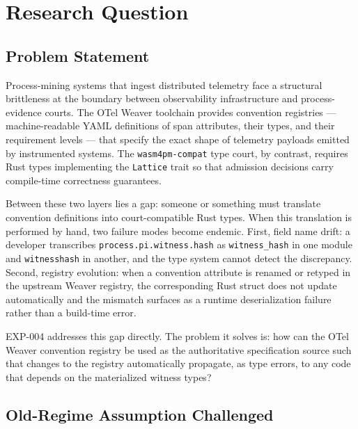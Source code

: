 
\section{Research Question}
\label{sec:otel-weaver-exp-004-registry-to-witness-question}

\subsection{Problem Statement}
\label{sec:otel-weaver-exp-004-registry-to-witness-problem}

Process-mining systems that ingest distributed telemetry face a structural brittleness at
the boundary between observability infrastructure and process-evidence courts. The OTel
Weaver toolchain provides convention registries --- machine-readable YAML definitions of
span attributes, their types, and their requirement levels --- that specify the exact shape
of telemetry payloads emitted by instrumented systems. The \texttt{wasm4pm-compat} type
court, by contrast, requires Rust types implementing the \texttt{Lattice} trait so that
admission decisions carry compile-time correctness guarantees.

Between these two layers lies a gap: someone or something must translate convention
definitions into court-compatible Rust types. When this translation is performed by hand,
two failure modes become endemic. First, field name drift: a developer transcribes
\texttt{process.pi.witness.hash} as \texttt{witness\_hash} in one module and
\texttt{witnesshash} in another, and the type system cannot detect the discrepancy. Second,
registry evolution: when a convention attribute is renamed or retyped in the upstream
Weaver registry, the corresponding Rust struct does not update automatically and the
mismatch surfaces as a runtime deserialization failure rather than a build-time error.

EXP-004 addresses this gap directly. The problem it solves is: how can the OTel Weaver
convention registry be used as the authoritative specification source such that changes to
the registry automatically propagate, as type errors, to any code that depends on the
materialized witness types?

\subsection{Old-Regime Assumption Challenged}
\label{sec:otel-weaver-exp-004-registry-to-witness-old-regime}


